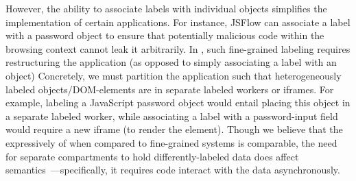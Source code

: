 
However, the ability to associate labels with individual objects
simplifies the implementation of certain applications. 
%
For instance, JSFlow can associate a label with a password object
to ensure that potentially malicious code within the browsing context
cannot leak it arbitrarily.
%
In \sys{}, such fine-grained labeling requires restructuring the
application (as opposed to simply associating a label with an object)
%
Concretely, we must partition the application such that
heterogeneously labeled objects/DOM-elements are in separate labeled
workers or iframes.
%
For example, labeling a JavaScript password object would entail
placing this object in a separate labeled worker, while associating a
label with a password-input field would require a new iframe (to
render the element).
%
Though we believe that the expressively of \sys{} when compared to
fine-grained systems is comparable, the need for separate compartments
to hold differently-labeled data does affect
semantics~\cite{Ingram:2012}---specifically, it requires code interact
with the data asynchronously.


